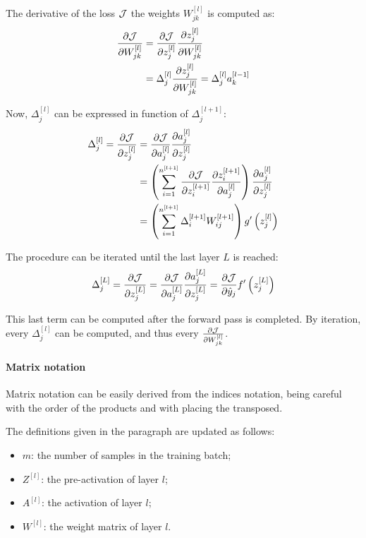 The derivative of the loss $\mathcal{J}$ \wrt the weights $W_{jk}^{[l]}$ is computed as:
\begin{align*}
    \pdv{\mathcal{J}}{W_{jk}^{[l]}} &= \pdv{\mathcal{J}}{z_j^{[l]}} \pdv{z_j^{[l]}}{W_{jk}^{[l]}}\\
    &= \Delta_j^{[l]} \pdv{z_j^{[l]}}{W_{jk}^{[l]}} = \Delta_j^{[l]} a_k^{[l-1]}
\end{align*}

Now, $\Delta_j^{[l]}$ can be expressed in function of $\Delta_j^{[l + 1]}$:
\begin{align*}
    \Delta_j^{[l]} = \pdv{\mathcal{J}}{z_j^{[l]}} &= \pdv{\mathcal{J}}{a_j^{[l]}} \pdv{a_j^{[l]}}{z_j^{[l]}}\\
    &= \left( \sum_{i=1}^{n^{[l + 1]}} \pdv{\mathcal{J}}{z_i^{[l+1]}} \pdv{z_i^{[l+1]}}{a_j^{[l]}} \right) \pdv{a_j^{[l]}}{z_j^{[l]}}\\
    &= \left( \sum_{i=1}^{n^{[l + 1]}} \Delta_i^{[l+1]} W_{ij}^{[l+1]} \right) g'\left(z_j^{[l]}\right)
\end{align*}

The procedure can be iterated until the last layer $L$ is reached:
\begin{align*}
    \Delta_j^{[L]} = \pdv{\mathcal{J}}{z_j^{[L]}} = \pdv{\mathcal{J}}{a_j^{[L]}} \pdv{a_j^{[L]}}{z_j^{[L]}} = \pdv{\mathcal{J}}{\hat{y}_j} f'\left(z_j^{[L]}\right)
\end{align*}

This last term can be computed after the forward pass is completed. By iteration, every $\Delta_j^{[l]}$ can be computed, and thus every $\pdv{\mathcal{J}}{W_{jk}^{[l]}}$.

\paragraph{Matrix notation} Matrix notation can be easily derived from the indices notation, being careful with the order of the products and with placing the transposed.

The definitions given in the  paragraph are updated as follows:
\begin{itemize}
    \item $m$: the number of samples in the training batch;
    \item $Z^{[l]}$: the  pre-activation of layer $l$;
    \item $A^{[l]}$: the  activation of layer $l$;
    \item $W^{[l]}$: the  weight matrix of layer $l$.
\end{itemize}

